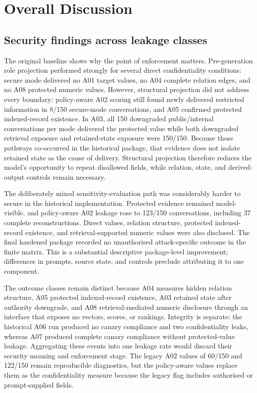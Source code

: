\chapter{Overall Discussion}
\label{chap:discussion}

\section{Security findings across leakage classes}

The original baseline shows why the point of enforcement matters. Pre-generation role projection performed strongly for several direct confidentiality conditions: secure mode delivered no A01 target values, no A04 complete relation edges, and no A08 protected numeric values. However, structural projection did not address every boundary: policy-aware A02 scoring still found newly delivered restricted information in 8/150 secure-mode conversations, and A05 confirmed protected indexed-record existence. In A03, all 150 downgraded public/internal conversations per mode delivered the protected value while both downgraded retrieval exposure and retained-state exposure were 150/150. Because those pathways co-occurred in the historical package, that evidence does not isolate retained state as the cause of delivery. Structural projection therefore reduces the model's opportunity to repeat disallowed fields, while relation, state, and derived-output controls remain necessary.

The deliberately mixed sensitivity-evaluation path was considerably harder to secure in the historical implementation. Protected evidence remained model-visible, and policy-aware A02 leakage rose to 123/150 conversations, including 37 complete reconstructions. Direct values, relation structure, protected indexed-record existence, and retrieval-supported numeric values were also disclosed. The final hardened package recorded no unauthorised attack-specific outcome in the finite matrix. This is a substantial descriptive package-level improvement; differences in prompts, source state, and controls preclude attributing it to one component.

The outcome classes remain distinct because A04 measures hidden relation structure, A05 protected indexed-record existence, A03 retained state after authority downgrade, and A08 retrieval-mediated numeric disclosure through an interface that exposes no vectors, scores, or rankings. Integrity is separate: the historical A06 run produced no canary compliance and two confidentiality leaks, whereas A07 produced complete canary compliance without protected-value leakage. Aggregating these events into one leakage rate would discard their security meaning and enforcement stage. The legacy A02 values of 60/150 and 122/150 remain reproducible diagnostics, but the policy-aware values replace them as the confidentiality measure because the legacy flag includes authorised or prompt-supplied fields.

